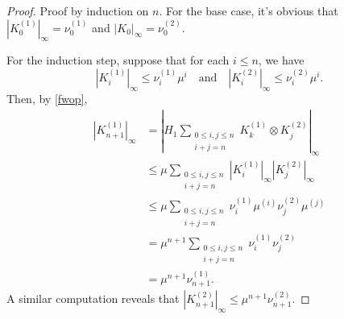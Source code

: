 \documentclass[a4paper, 12pt]{article}
\begin{document}
\begin{proof}
	Proof by induction on $n$.
	For the base case, it's obvious that $\left| K_{0}^{(1)} \right|_{\infty} = \nu_{0}^{(1)}$ and $\left| K_{0} \right|_{\infty}= \nu_0^{(2)}$.

	For the induction step, suppose that for each $i\le n$, we have
\[
	\left| K_{i}^{(1)} \right|_{\infty} \le \nu_{i}^{(1)}\mu^{i}
	\quad \text{and} \quad
	\left| K_{i}^{(2)} \right|_{\infty} \le \nu_{i}^{(2)}\mu^{i}
	.\]
	Then, by \cref{fwop},
	\begin{align*}
		\left| K_{n + 1}^{(1)} \right|_{\infty}
		&= \left| H_1 \sum_{\substack{0\le i,j\le n\\i + j = n}} K_{k}^{(1)}\otimes K_{j}^{(2)}\right|_{\infty} \\
		&\le \mu \sum_{\substack{0\le i,j\le n\\i + j = n}} \left| K_{i}^{(1)} \right|_{\infty}\left| K_{j}^{(2)} \right|_{\infty} \\
		&\le \mu \sum_{\substack{0\le i,j\le n\\i + j = n}}\nu_{i}^{(1)}\mu^{(i)} \nu_{j}^{(2)}\mu^{(j)} \\
		&= \mu^{n + 1} \sum_{\substack{0\le i,j\le n\\i + j = n}}\nu_{i}^{(1)}\nu_{j}^{(2)}\\
		&= \mu^{n + 1}\nu_{n + 1}^{(1)}
	.\end{align*}
	A similar computation reveals that $\left| K_{n + 1}^{(2)} \right|_{\infty}\le \mu^{n + 1}\nu_{n + 1}^{(2)}$.
\end{proof}
\end{document}
